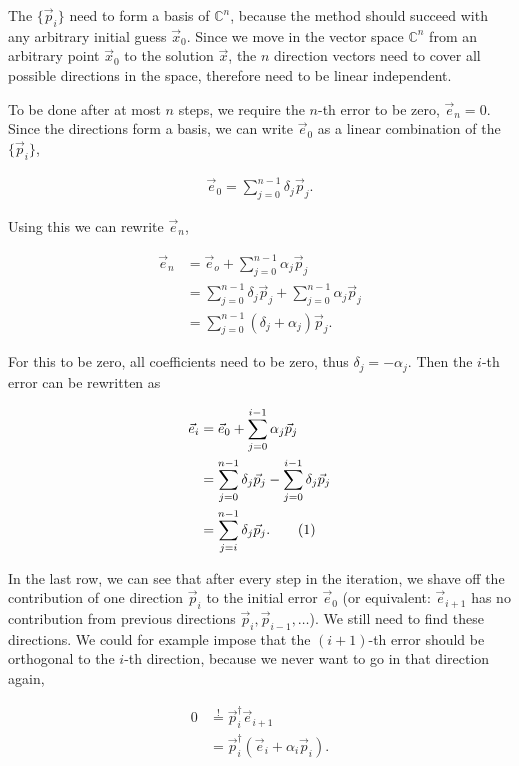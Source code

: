 \documentclass{article}
\newcommand\numberthis{\addtocounter{equation}{1}\tag{\theequation}}
\theoremstyle{plain} %
\theoremstyle{convention} %
\theoremstyle{remark} %
\numberwithin{equation}{section}
\begin{document}
The $\{\vec{p}_i\}$ need to form a basis of $\mathbb{C}^n$, because the method should succeed with any arbitrary initial guess $\vec{x}_0$. Since we move in the vector space $\mathbb{C}^n$ from an arbitrary point $\vec{x}_0$ to the solution $\vec{x}$, the $n$ direction vectors need to cover all possible directions in the space, therefore need to be linear independent.

To be done after at most $n$ steps, we require the $n$-th error to be zero, $\vec{e}_n = 0$. Since the directions form a basis, we can write $\vec{e}_0$ as a linear combination of the $\{\vec{p}_i\}$,

\begin{align*}
    \vec{e}_{0} = \sum_{j=0}^{n-1} \delta_j \vec{p}_j.
\end{align*}

Using this we can rewrite $\vec{e}_n$,

\begin{align*}
    \vec{e}_{n} &= \vec{e}_o + \sum_{j=0}^{n-1} \alpha_j \vec{p}_j \\
                &= \sum_{j=0}^{n-1} \delta_j \vec{p}_j + \sum_{j=0}^{n-1} \alpha_j \vec{p}_j \\
                &= \sum_{j=0}^{n-1} (\delta_j + \alpha_j) \vec{p}_j.
\end{align*}

For this to be zero, all coefficients need to be zero, thus $\delta_j = - \alpha_j$. Then the $i$-th error can be rewritten as

\begin{align*}
    \vec{e}_{i} &= \vec{e}_0 + \sum_{j=0}^{i-1} \alpha_j \vec{p}_j \\
                &= \sum_{j=0}^{n-1} \delta_j \vec{p}_j - \sum_{j=0}^{i-1} \delta_j \vec{p}_j \\
                &= \sum_{j=i}^{n-1} \delta_j \vec{p}_j. \numberthis \label{eq:error_i}
\end{align*}

In the last row, we can see that after every step in the iteration, we shave off the contribution of one direction $\vec{p}_i$ to the initial error $\vec{e}_0$ (or equivalent: $\vec{e}_{i+1}$ has no contribution from previous directions $\vec{p}_i, \vec{p}_{i-1}, \dots$). We still need to find these directions. We could for example impose that the $(i+1)$-th error should be orthogonal to the $i$-th direction, because we never want to go in that direction again,

\begin{align*}
    0 &\stackrel{!}{=} \vec{p}_i^{\dagger} \vec{e}_{i+1} \\
                    &= \vec{p}_i^{\dagger} ( \vec{e}_{i} + \alpha_i \vec{p}_i ).
\end{align*}
\end{document}
